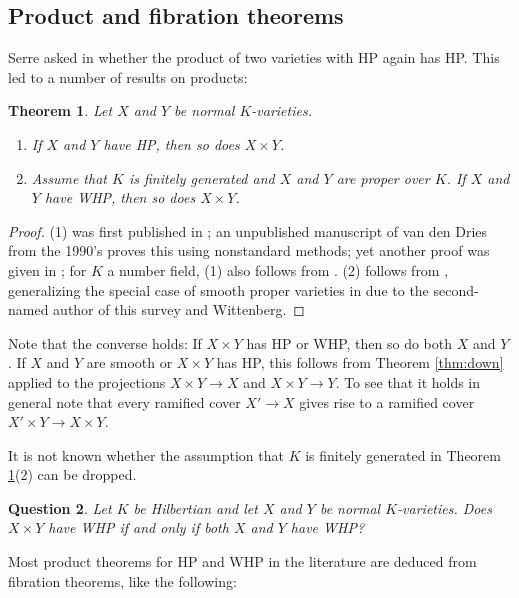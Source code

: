 \documentclass[10pt,a4paper]{amsart}
\theoremstyle{plain}
\newtheorem{theorem}{Theorem}
\newtheorem{question}[theorem]{Question}
\theoremstyle{remark}
\numberwithin{theorem}{section}
\begin{document}
\subsection{Product and fibration theorems}

Serre asked in \cite[p.~20]{Serre} whether the product of two varieties with HP again has HP.
This led to a number of results on products:

\begin{theorem}\label{thm:product}
Let $X$ and $Y$ be normal $K$-varieties.
\begin{enumerate}
    \item If $X$ and $Y$ have HP, then so does $X\times Y$. 
    \item Assume that $K$ is finitely generated and $X$ and $Y$ are proper over $K$. If $X$ and $Y$ have WHP, then so does $X\times Y$.  
\end{enumerate}
\end{theorem}

\begin{proof}
(1) was first published in \cite{BFP};
an unpublished manuscript of van den Dries from the 1990's proves this using nonstandard methods;
yet another proof was given in \cite[Corollary 3.5]{BFP24};
for $K$ a number field, (1) also follows from \cite[Lemma 8.12]{HW16}.
(2) follows from \cite[Theorem 1.4]{Luger2}, generalizing the special case of smooth proper varieties in \cite[Theorem 1.9]{CDJLZ} due to the second-named author of this survey and Wittenberg. 
\end{proof}

Note that the converse holds: If $X\times Y$ has HP or WHP, then so do both $X$ and $Y$.
If $X$ and $Y$ are smooth or $X\times Y$ has HP,
this follows from Theorem \ref{thm:down}
applied to the projections
$X\times Y\rightarrow X$ and $X\times Y\rightarrow Y$.
To see that it holds in general note that every ramified cover $X'\rightarrow X$ gives rise to a ramified cover $X'\times Y\rightarrow X\times Y$.

It is not known whether the assumption that $K$ is finitely generated in Theorem \ref{thm:product}(2) can be dropped.  
\begin{question}\label{q:product}
Let $K$ be Hilbertian 
and let $X$ and $Y$ be normal $K$-varieties. 
Does $X\times Y$ have WHP if and only if both $X$ and $Y$ have WHP?
\end{question}
 
Most product theorems for HP and WHP in the literature are deduced 
from fibration theorems, like the following:
\end{document}
